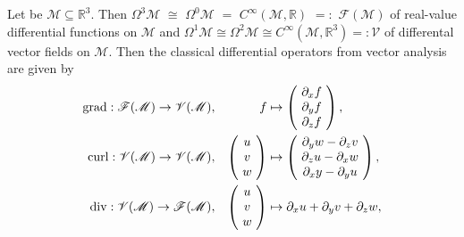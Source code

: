 \begin{beispiel}
	\label{bsp:classical-vector-analysis}
	\cite[254-262]{Jaenich-1992}
	Let be $\mathscr{M} \subseteq \mathbb{R}^3$.
	Then $\Omega^3 \mathscr{M}$ $\cong$ $\Omega^0 \mathscr{M}$ $=$ $C^\infty(\mathscr{M}, \mathbb{R})$ $=:$ $\mathscr{F}(\mathscr{M})$ of real-value differential functions on $\mathscr{M}$ and 
	$\Omega^1 \mathscr{M} \cong \Omega^2 \mathscr{M} \cong C^\infty(\mathscr{M}, \mathbb{R}^3) =: \mathscr{V}$
	of differental vector fields on $\mathscr{M}$.
	Then the classical differential operators from vector analysis are given by
	\begin{align}
		\mathrm{grad}: \mathscr{F}(\mathscr{M}) \to \mathscr{V}(\mathscr{M}),
		& &
		f 
		&
		\mapsto 
		\left(\begin{array}{@{\ }c@{\ }}
			\partial_x f \\ \partial_y f \\ \partial_z f
		\end{array}\right),
		\nonumber \\
		\mathrm{curl}: \mathscr{V}(\mathscr{M}) \to \mathscr{V}(\mathscr{M}),
		& &
		\left(\begin{array}{@{\ }c@{\ }}
			u \\ v \\ w
		\end{array}\right)
		&
		\mapsto
		\left(\begin{array}{@{\ }c@{\ }}
			\partial_y w - \partial_z v \\ 
			\partial_z u - \partial_x w \\
			\partial_x y - \partial_y u
		\end{array}\right),
		\label{eq:classical-vector-analysis-opertaors-in-R^3}
		\\
		\mathrm{div}: \mathscr{V}(\mathscr{M}) \to \mathscr{F}(\mathscr{M}),
		& &
		\left(\begin{array}{@{\ }c@{\ }}
			u \\ v \\ w
		\end{array}\right)
		&
		\mapsto 
		\partial_x u + \partial_y v + \partial_z w,
		\nonumber
	\end{align}

\end{beispiel}
